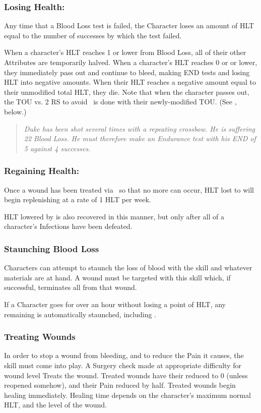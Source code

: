 \documentclass[oneside,11pt,english]{book}
\begin{document}
\subsubsection{Losing Health:}
Any time that a Blood Loss test is failed, the Character loses an amount of HLT equal to the number of 
successes by which the test failed.

When a character's HLT reaches 1 or lower from Blood Loss, all of their other Attributes are temporarily halved. When a character’s HLT reaches 0 or or lower, they immediately pass out and continue to bleed, making END tests and losing HLT into negative amounts. When their HLT reaches a negative amount equal to their unmodified total HLT, they die. Note that when the character passes out, the TOU vs. 2 RS to avoid ~is done with their newly-modified TOU. (See , below.)

\begin{quote}
	\emph{Duke has been shot several times with a repeating crossbow. He is suffering 22 Blood Loss. He must therefore make an Endurance test with his END of 5 against 4 successes.}
\end{quote}
\subsubsection{Regaining Health:}
Once a wound has been treated via ~so that no more  can occur, HLT lost to  will begin replenishing at a rate of 1 HLT per week.

HLT lowered by  is also recovered in this manner, but only after all of a character’s Infections have been defeated.

\subsubsection{Staunching Blood Loss}
Characters can attempt to staunch the loss of blood with the  skill and whatever materials are at hand. A wound must be targeted with this skill which, if successful, terminates all  from that wound.

If a Character goes for over an hour without losing a point of HLT, any remaining  is automatically staunched, including .

\subsubsection{Treating Wounds}
In order to stop a wound from bleeding, and to reduce the Pain it causes, the  skill must come into 
play. A Surgery check made at appropriate difficulty for wound level Treats the wound. Treated wounds 
have their  reduced to 0 (unless reopened somehow), and their Pain reduced by half. Treated 
wounds begin healing immediately. Healing time depends on the character’s maximum normal HLT, and 
the level of the wound. 
\end{document}
